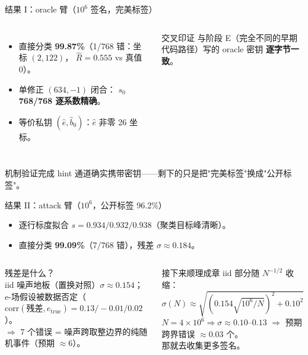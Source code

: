 \documentclass[11pt,aspectratio=169]{ctexbeamer}
\begin{document}
\begin{frame}{结果 I：oracle 臂（$10^6$ 签名，完美标签）}
  \begin{columns}[T]
    \begin{itemize}
      \item 直接分类 \textbf{99.87\%}（1/768 错：坐标 $(2,122)$，
            $\hat R = 0.555$ vs 真值 0）。
      \item 单修正 $(634,-1)$ 闭合：
            \textbf{$s_0$ 768/768 逐系数精确}。
      \item 等价私钥 $(\hat e,\hat b_0)$：$\hat e$ 非零 26 坐标。
    \end{itemize}
    \begin{exampleblock}{交叉印证}
      \small 与阶段 E（完全不同的早期代码路径）写的 oracle 密钥
      \textbf{逐字节一致}。
    \end{exampleblock}
  \end{columns}
  \vspace{0.3em}
  \begin{block}{机制验证完成}
    \small hint 通道确实携带密钥——剩下的只是把"完美标签"换成"公开标签"。
  \end{block}
\end{frame}

\begin{frame}{结果 II：attack 臂（$10^6$，公开标签 96.2\%）}
  \begin{itemize}
    \item 逐行标度拟合 $s = 0.934/0.932/0.938$（聚类目标峰清晰）。
    \item 直接分类 \textbf{99.09\%}（7/768 错），残差 $\sigma\approx0.184$。
  \end{itemize}
  \begin{columns}[T]
    \begin{block}{残差是什么？}
      \small iid 噪声地板（置换对照）$\sigma\approx0.154$；
      e-场假设被数据否定（$\mathrm{corr}(\text{残差},e_{\mathrm{true}})
      = 0.13/-0.01/0.02$）。\\
      $\Rightarrow$ 7 个错误 = 噪声跨取整边界的纯随机事件（预期 $\approx6$）。
    \end{block}
    \begin{alertblock}{接下来顺理成章}
      \small iid 部分随 $N^{-1/2}$ 收缩：\\
      $\sigma(N)\approx\sqrt{(0.154\sqrt{10^6/N})^2+0.10^2}$\\[0.2em]
      $N=4\times10^6 \Rightarrow \sigma\approx0.10$--$0.13$
      $\Rightarrow$ 预期跨界错误 $\approx 0.03$ 个。\\
      \textcolor{ravbronze}{那就去收集更多签名。}
    \end{alertblock}
  \end{columns}
\end{frame}
\end{document}
